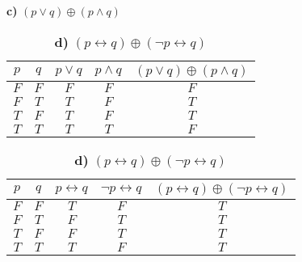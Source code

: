 \documentclass[10pt]{ctexart}
\begin{document}
    \begin{table}[h]
        \begin{subtable}[h]{3in}
            \setlength{\abovecaptionskip}{0pt}
            \setlength{\belowcaptionskip}{0pt}
            \centering
            \caption*{\textbf{c)} $(p \vee q) \oplus (p \wedge q)$}
            \begin{tabular}{|c|c|c|c|c|}
                \hline
                $p$ & $q$ & $p \vee q$ & $p \wedge q$ & $(p \vee q) \oplus (p \wedge q)$ \\ 
                \hline
                $F$ & $F$ & $F$ & $F$ & $F$ \\ 
                \hline
                $F$ & $T$ & $T$ & $F$ & $T$ \\ 
                \hline
                $T$ & $F$ & $T$ & $F$ & $T$ \\ 
                \hline
                $T$ & $T$ & $T$ & $T$ & $F$ \\ 
                \hline
            \end{tabular}         
        \end{subtable}
        \begin{subtable}[h]{3in}
            \setlength{\abovecaptionskip}{0pt}
            \setlength{\belowcaptionskip}{0pt}
            \centering
            \caption*{\textbf{d)} $(p \leftrightarrow q) \oplus (\neg p \leftrightarrow q)$}
            \begin{tabular}{|c|c|c|c|c|}
                \hline
                $p$ & $q$ & $p \leftrightarrow q$ & $\neg p \leftrightarrow q$ & $(p \leftrightarrow q) \oplus (\neg p \leftrightarrow q)$\\
                \hline
                $F$ & $F$ & $T$ & $F$ & $T$ \\ 
                \hline
                $F$ & $T$ & $F$ & $T$ & $T$ \\ 
                \hline
                $T$ & $F$ & $F$ & $T$ & $T$ \\ 
                \hline
                $T$ & $T$ & $T$ & $F$ & $T$ \\ 
                \hline
            \end{tabular}
        \end{subtable}
    \end{table}
\end{document}

